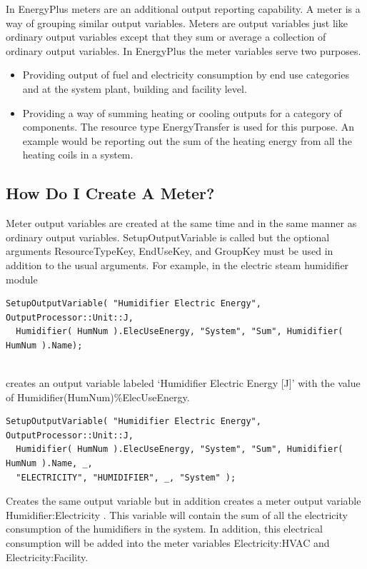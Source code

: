 In EnergyPlus meters are an additional output reporting capability. A meter is a way of grouping similar output variables. Meters are output variables just like ordinary output variables except that they sum or average a collection of ordinary output variables. In EnergyPlus the meter variables serve two purposes.

\begin{itemize}
\item
  Providing output of fuel and electricity consumption by end use categories and at the system plant, building and facility level.
\item
  Providing a way of summing heating or cooling outputs for a category of components. The resource type EnergyTransfer is used for this purpose. An example would be reporting out the sum of the heating energy from all the heating coils in a system.
\end{itemize}

\subsection{How Do I Create A Meter?}\label{how-do-i-create-a-meter}

Meter output variables are created at the same time and in the same manner as ordinary output variables. SetupOutputVariable is called but the optional arguments ResourceTypeKey, EndUseKey, and GroupKey must be used in addition to the usual arguments. For example, in the electric steam humidifier module

\begin{lstlisting}
SetupOutputVariable( "Humidifier Electric Energy", OutputProcessor::Unit::J, 
  Humidifier( HumNum ).ElecUseEnergy, "System", "Sum", Humidifier( HumNum ).Name);
 
\end{lstlisting}

creates an output variable labeled `Humidifier Electric Energy {[}J{]}' with the value of Humidifier(HumNum)\%ElecUseEnergy.

\begin{lstlisting}
SetupOutputVariable( "Humidifier Electric Energy", OutputProcessor::Unit::J, 
  Humidifier( HumNum ).ElecUseEnergy, "System", "Sum", Humidifier( HumNum ).Name, _, 
  "ELECTRICITY", "HUMIDIFIER", _, "System" );

\end{lstlisting}


Creates the same output variable but in addition creates a meter output variable Humidifier:Electricity . This variable will contain the sum of all the electricity consumption of the humidifiers in the system. In addition, this electrical consumption will be added into the meter variables Electricity:HVAC and Electricity:Facility.

